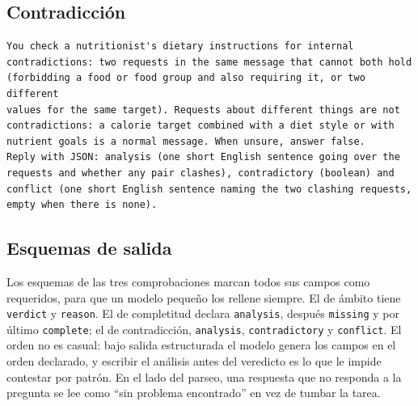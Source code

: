 \subsection*{Contradicción}

\begin{footnotesize}
\begin{verbatim}
You check a nutritionist's dietary instructions for internal
contradictions: two requests in the same message that cannot both hold
(forbidding a food or food group and also requiring it, or two different
values for the same target). Requests about different things are not
contradictions: a calorie target combined with a diet style or with
nutrient goals is a normal message. When unsure, answer false.
Reply with JSON: analysis (one short English sentence going over the
requests and whether any pair clashes), contradictory (boolean) and
conflict (one short English sentence naming the two clashing requests,
empty when there is none).
\end{verbatim}
\end{footnotesize}

\subsection*{Esquemas de salida}

Los esquemas de las tres comprobaciones marcan todos sus campos como requeridos, para que un modelo pequeño los rellene siempre. El de ámbito tiene \texttt{verdict} y \texttt{reason}. El de completitud declara \texttt{analysis}, después \texttt{missing} y por último \texttt{complete}; el de contradicción, \texttt{analysis}, \texttt{contradictory} y \texttt{conflict}. El orden no es casual: bajo salida estructurada el modelo genera los campos en el orden declarado, y escribir el análisis antes del veredicto es lo que le impide contestar por patrón. En el lado del parseo, una respuesta que no responda a la pregunta se lee como ``sin problema encontrado'' en vez de tumbar la tarea.
